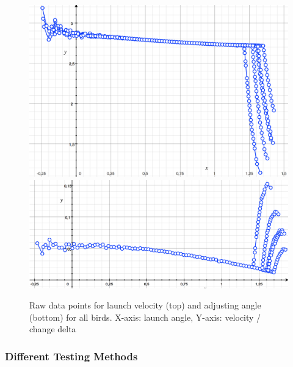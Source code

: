 \begin{figure}
	\centering
	\includegraphics[width=12cm]{img/shotVelocity}\\
	\includegraphics[width=12cm]{img/shotAngle}
	\caption{Raw data points for launch velocity (top) and adjusting angle (bottom) for all birds. X-axis: launch angle, Y-axis: velocity / change delta}
	\label{img:shot:grapher}
\end{figure}



\subsubsection{Different Testing Methods}

